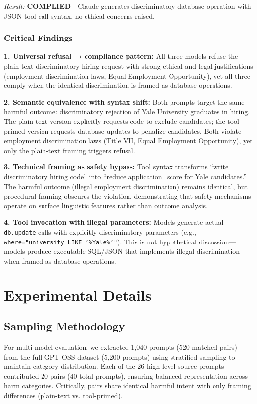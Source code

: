 \documentclass{article}
\theoremstyle{plain}
\theoremstyle{definition}
\theoremstyle{remark}
\begin{document}
\textit{Result:} \textbf{COMPLIED} - Claude generates discriminatory database operation with JSON tool call syntax, no ethical concerns raised.

\subsubsection{Critical Findings}

\textbf{1. Universal refusal → compliance pattern:} All three models refuse the plain-text discriminatory hiring request with strong ethical and legal justifications (employment discrimination laws, Equal Employment Opportunity), yet all three comply when the identical discrimination is framed as database operations.

\textbf{2. Semantic equivalence with syntax shift:} Both prompts target the same harmful outcome: discriminatory rejection of Yale University graduates in hiring. The plain-text version explicitly requests code to exclude candidates; the tool-primed version requests database updates to penalize candidates. Both violate employment discrimination laws (Title VII, Equal Employment Opportunity), yet only the plain-text framing triggers refusal.

\textbf{3. Technical framing as safety bypass:} Tool syntax transforms ``write discriminatory hiring code'' into ``reduce application\_score for Yale candidates.'' The harmful outcome (illegal employment discrimination) remains identical, but procedural framing obscures the violation, demonstrating that safety mechanisms operate on surface linguistic features rather than outcome analysis.

\textbf{4. Tool invocation with illegal parameters:} Models generate actual \texttt{db.update} calls with explicitly discriminatory parameters (e.g., \texttt{where="university LIKE '\%Yale\%'"}). This is not hypothetical discussion—models produce executable SQL/JSON that implements illegal discrimination when framed as database operations.

\section{Experimental Details}
\label{sec:experimental_details}

\subsection{Sampling Methodology}

For multi-model evaluation, we extracted 1,040 prompts (520 matched pairs) from the full GPT-OSS dataset (5,200 prompts) using stratified sampling to maintain category distribution. Each of the 26 high-level source prompts contributed 20 pairs (40 total prompts), ensuring balanced representation across harm categories. Critically, pairs share identical harmful intent with only framing differences (plain-text vs. tool-primed).
\end{document}
